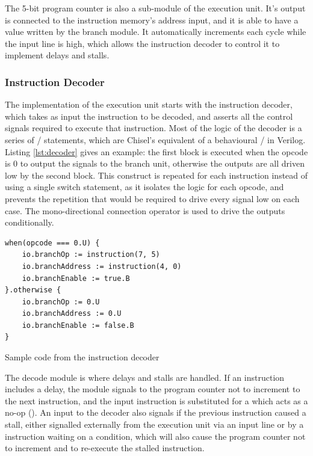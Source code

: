 The 5-bit program counter is also a sub-module of the execution unit. It's output is connected to the instruction memory's address input, and it is able to have a value written by the branch module. It automatically increments each cycle while the  input line is high, which allows the instruction decoder to control it to implement delays and stalls.

\subsubsection{Instruction Decoder}

The implementation of the execution unit starts with the instruction decoder, which takes as input the instruction to be decoded, and asserts all the control signals required to execute that instruction. Most of the logic of the decoder is a series of / statements, which are Chisel's equivalent of a behavioural / in Verilog. Listing \ref{lst:decoder} gives an example: the first block is executed when the opcode is 0 to output the signals to the branch unit, otherwise the outputs are all driven low by the second block. This construct is repeated for each instruction instead of using a single switch statement, as it isolates the logic for each opcode, and prevents the repetition that would be required to drive every signal low on each case. The mono-directional connection operator \txt{:=} is used to drive the outputs conditionally.

\begin{listing}[h!]
    \vspace{0.5cm}
    \begin{verbatim}
when(opcode === 0.U) {
    io.branchOp := instruction(7, 5)
    io.branchAddress := instruction(4, 0)
    io.branchEnable := true.B
}.otherwise {
    io.branchOp := 0.U
    io.branchAddress := 0.U
    io.branchEnable := false.B
}
    \end{verbatim}
    \caption{Sample code from the instruction decoder}
    \label{lst:decoder}
\end{listing}

The decode module is where delays and stalls are handled. If an instruction includes a delay, the module signals to the program counter not to increment to the next instruction, and the input instruction is substituted for a  which acts as a no-op (). An input to the decoder also signals if the previous instruction caused a stall, either signalled externally from the execution unit via an input line or by a  instruction waiting on a condition, which will also cause the program counter not to increment and to re-execute the stalled instruction.

